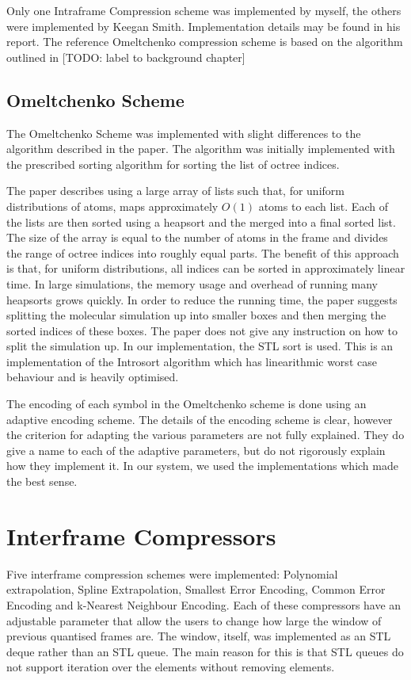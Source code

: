 \documentclass[a4paper,11pt]{report}
\begin{document}
Only one Intraframe Compression scheme was implemented by myself, the others were implemented by Keegan Smith. Implementation details may be found in his report. The reference Omeltchenko compression scheme is based on the algorithm outlined in [TODO: label to background chapter]

\subsection{Omeltchenko Scheme}

The Omeltchenko Scheme was implemented with slight differences to the algorithm described in the paper. The algorithm was initially implemented with the prescribed sorting algorithm for sorting the list of octree indices. 

The paper describes using a large array of lists such that, for uniform distributions of atoms, maps approximately $O(1)$ atoms to each list. Each of the lists are then sorted using a heapsort and the merged into a final sorted list. The size of the array is equal to the number of atoms in the frame and divides the range of octree indices into roughly equal parts. The benefit of this approach is that, for uniform distributions, all indices can be sorted in approximately linear time.  In large simulations, the memory usage and overhead of running many heapsorts grows quickly. In order to reduce the running time, the paper suggests splitting the molecular simulation up into smaller boxes and then merging the sorted indices of these boxes. The paper does not give any instruction on how to split the simulation up. In our implementation, the STL sort is used. This is an implementation of the Introsort algorithm which has linearithmic worst case behaviour and is heavily optimised.

The encoding of each symbol in the Omeltchenko scheme is done using an adaptive encoding scheme. The details of the encoding scheme is clear, however the criterion for adapting the various parameters are not fully explained. They do give a name to each of the adaptive parameters, but do not rigorously explain how they implement it. In our system, we used the implementations which made the best sense.

\section{Interframe Compressors}

Five interframe compression schemes were implemented: Polynomial extrapolation, Spline Extrapolation, Smallest Error Encoding, Common Error Encoding and k-Nearest Neighbour Encoding. Each of these compressors have an adjustable parameter that allow the users to change how large the window of previous quantised frames are. The window, itself, was implemented as an STL deque rather than an STL queue. The main reason for this is that STL queues do not support iteration over the elements without removing elements. 
\end{document}

